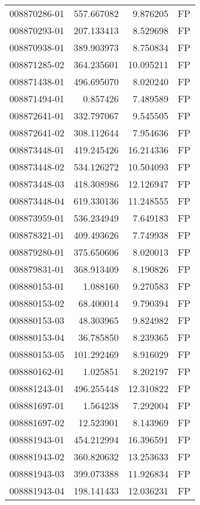 \begin{tabular}{lrrl}
008870286-01 &  557.667082 &     9.876205 &   FP \\
008870293-01 &  207.133413 &     8.529698 &   FP \\
008870938-01 &  389.903973 &     8.750834 &   FP \\
008871285-02 &  364.235601 &    10.095211 &   FP \\
008871438-01 &  496.695070 &     8.020240 &   FP \\
008871494-01 &    0.857426 &     7.489589 &   FP \\
008872641-01 &  332.797067 &     9.545505 &   FP \\
008872641-02 &  308.112644 &     7.954636 &   FP \\
008873448-01 &  419.245426 &    16.214336 &   FP \\
008873448-02 &  534.126272 &    10.504093 &   FP \\
008873448-03 &  418.308986 &    12.126947 &   FP \\
008873448-04 &  619.330136 &    11.248555 &   FP \\
008873959-01 &  536.234949 &     7.649183 &   FP \\
008878321-01 &  409.493626 &     7.749938 &   FP \\
008879280-01 &  375.650606 &     8.020013 &   FP \\
008879831-01 &  368.913409 &     8.190826 &   FP \\
008880153-01 &    1.088160 &     9.270583 &   FP \\
008880153-02 &   68.400014 &     9.790394 &   FP \\
008880153-03 &   48.303965 &     9.824982 &   FP \\
008880153-04 &   36.785850 &     8.239365 &   FP \\
008880153-05 &  101.292469 &     8.916029 &   FP \\
008880162-01 &    1.025851 &     8.202197 &   FP \\
008881243-01 &  496.255448 &    12.310822 &   FP \\
008881697-01 &    1.564238 &     7.292004 &   FP \\
008881697-02 &   12.523901 &     8.143969 &   FP \\
008881943-01 &  454.212994 &    16.396591 &   FP \\
008881943-02 &  360.820632 &    13.253633 &   FP \\
008881943-03 &  399.073388 &    11.926834 &   FP \\
008881943-04 &  198.141433 &    12.036231 &   FP \\

\end{tabular}

